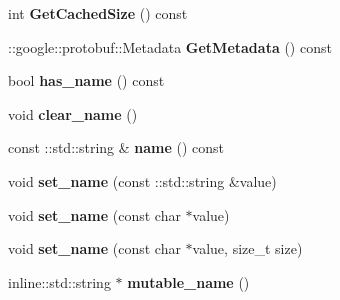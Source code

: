\begin{DoxyCompactItemize}
\item 
\hypertarget{classmonopoly_1_1_buyable_grid_ae966561fc0934316ca63e12a7e10a32a}{}int {\bfseries Get\+Cached\+Size} () const \label{classmonopoly_1_1_buyable_grid_ae966561fc0934316ca63e12a7e10a32a}

\item 
\hypertarget{classmonopoly_1_1_buyable_grid_abcda142a419c27ff81488a919f259ce5}{}\+::google\+::protobuf\+::\+Metadata {\bfseries Get\+Metadata} () const \label{classmonopoly_1_1_buyable_grid_abcda142a419c27ff81488a919f259ce5}

\item 
\hypertarget{classmonopoly_1_1_buyable_grid_a9d5e4ca44c3c6b4afb3620e15089ed18}{}bool {\bfseries has\+\_\+name} () const \label{classmonopoly_1_1_buyable_grid_a9d5e4ca44c3c6b4afb3620e15089ed18}

\item 
\hypertarget{classmonopoly_1_1_buyable_grid_a74f4de541ce6a311eab7d42af73b1775}{}void {\bfseries clear\+\_\+name} ()\label{classmonopoly_1_1_buyable_grid_a74f4de541ce6a311eab7d42af73b1775}

\item 
\hypertarget{classmonopoly_1_1_buyable_grid_aeaf23294afbbeae9cd46fd5676515a73}{}const \+::std\+::string \& {\bfseries name} () const \label{classmonopoly_1_1_buyable_grid_aeaf23294afbbeae9cd46fd5676515a73}

\item 
\hypertarget{classmonopoly_1_1_buyable_grid_af7b70a800efcca9e60a6914a006cd5f4}{}void {\bfseries set\+\_\+name} (const \+::std\+::string \&value)\label{classmonopoly_1_1_buyable_grid_af7b70a800efcca9e60a6914a006cd5f4}

\item 
\hypertarget{classmonopoly_1_1_buyable_grid_a40bad608625a913ce3fd7b4ff71eb6e6}{}void {\bfseries set\+\_\+name} (const char $\ast$value)\label{classmonopoly_1_1_buyable_grid_a40bad608625a913ce3fd7b4ff71eb6e6}

\item 
\hypertarget{classmonopoly_1_1_buyable_grid_a1ce765e2028aa17eb14e9741af8690e6}{}void {\bfseries set\+\_\+name} (const char $\ast$value, size\+\_\+t size)\label{classmonopoly_1_1_buyable_grid_a1ce765e2028aa17eb14e9741af8690e6}

\item 
\hypertarget{classmonopoly_1_1_buyable_grid_a2893e78b3ee02e9b498676a07fa36861}{}inline\+::std\+::string $\ast$ {\bfseries mutable\+\_\+name} ()\label{classmonopoly_1_1_buyable_grid_a2893e78b3ee02e9b498676a07fa36861}


\end{DoxyCompactItemize}
